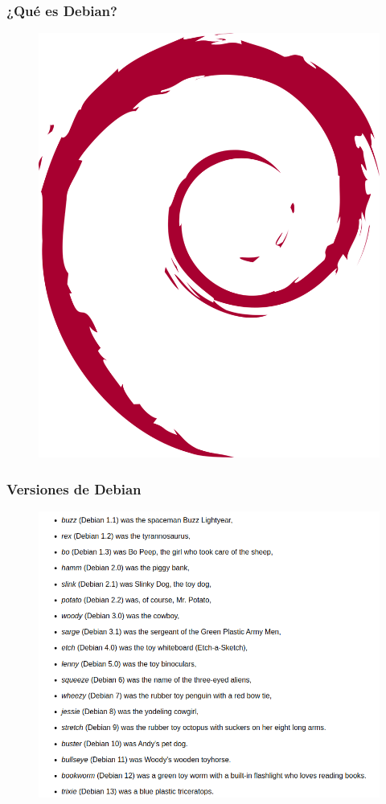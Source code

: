 \documentclass{beamer}
\begin{document}
\begin{frame}
  \frametitle{¿Qué es Debian?}
	\begin{figure}
		\centering
		\includegraphics[width=0.7\linewidth]{images/debian}
		\label{fig:debian}
	\end{figure}
\end{frame}
\begin{frame}
  \frametitle{Versiones de Debian}
	\begin{figure}
		\centering
		\includegraphics[width=0.7\linewidth]{images/versions.png}
		\label{fig:versiones de Debian}
	\end{figure}
\end{frame}
\end{document}
